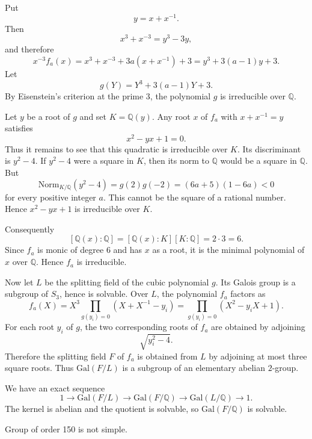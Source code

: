 \begin{solution}
Put
\[
y=x+x^{-1}.
\]
Then
\[
x^3+x^{-3}=y^3-3y,
\]
and therefore
\[
x^{-3}f_a(x)
=x^3+x^{-3}+3a(x+x^{-1})+3
=y^3+3(a-1)y+3.
\]
Let
\[
g(Y)=Y^3+3(a-1)Y+3.
\]
By Eisenstein's criterion at the prime $3$, the polynomial $g$ is irreducible over $\mathbb{Q}$.

Let $y$ be a root of $g$ and set $K=\mathbb{Q}(y)$. Any root $x$ of $f_a$ with $x+x^{-1}=y$ satisfies
\[
x^2-yx+1=0.
\]
Thus it remains to see that this quadratic is irreducible over $K$. Its discriminant is $y^2-4$. If $y^2-4$ were a square in $K$, then its norm to $\mathbb{Q}$ would be a square in $\mathbb{Q}$. But
\[
\mathrm{Norm}_{K/\mathbb{Q}}(y^2-4)
=g(2)g(-2)
=(6a+5)(1-6a)<0
\]
for every positive integer $a$. This cannot be the square of a rational number. Hence $x^2-yx+1$ is irreducible over $K$.

Consequently
\[
[\mathbb{Q}(x):\mathbb{Q}]
=[\mathbb{Q}(x):K][K:\mathbb{Q}]
=2\cdot 3=6.
\]
Since $f_a$ is monic of degree $6$ and has $x$ as a root, it is the minimal polynomial of $x$ over $\mathbb{Q}$. Hence $f_a$ is irreducible.

Now let $L$ be the splitting field of the cubic polynomial $g$. Its Galois group is a subgroup of $S_3$, hence is solvable. Over $L$, the polynomial $f_a$ factors as
\[
f_a(X)=X^3\prod_{g(y_i)=0}(X+X^{-1}-y_i)
=\prod_{g(y_i)=0}(X^2-y_iX+1).
\]
For each root $y_i$ of $g$, the two corresponding roots of $f_a$ are obtained by adjoining
\[
\sqrt{y_i^2-4}.
\]
Therefore the splitting field $F$ of $f_a$ is obtained from $L$ by adjoining at most three square roots. Thus $\mathrm{Gal}(F/L)$ is a subgroup of an elementary abelian $2$-group.

We have an exact sequence
\[
1\longrightarrow \mathrm{Gal}(F/L)
\longrightarrow \mathrm{Gal}(F/\mathbb{Q})
\longrightarrow \mathrm{Gal}(L/\mathbb{Q})
\longrightarrow 1.
\]
The kernel is abelian and the quotient is solvable, so $\mathrm{Gal}(F/\mathbb{Q})$ is solvable.
\end{solution}

\begin{exercise}
\label{algebra:2010:11}
Group of order 150 is not simple.
\end{exercise}

